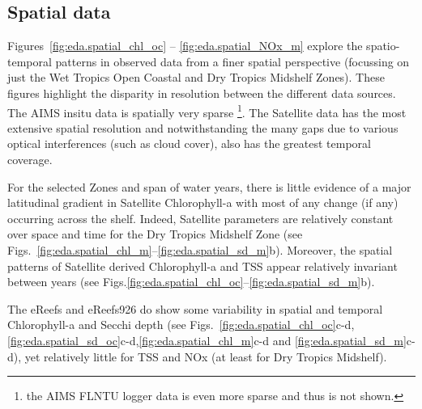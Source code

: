 \clearpage

\subsection{Spatial data}

Figures~\ref{fig:eda.spatial_chl_oc} -- \ref{fig:eda.spatial_NOx_m} explore the spatio-temporal
patterns in observed data from a finer spatial perspective (focussing on just the Wet Tropics Open
Coastal and Dry Tropics Midshelf Zones).  These figures highlight the disparity in resolution
between the different data sources. The AIMS insitu data is spatially very sparse \footnote{the AIMS
FLNTU logger data is even more sparse and thus is not shown.}.  The Satellite data has the most
extensive spatial resolution and notwithstanding the many gaps due to various optical interferences
(such as cloud cover), also has the greatest temporal coverage.

For the selected Zones and span of water years, there is little evidence of a major latitudinal
gradient in Satellite Chlorophyll-a with most of any change (if any) occurring across the shelf.
Indeed, Satellite parameters are relatively constant over space and time for the Dry Tropics
Midshelf Zone (see Figs.~\ref{fig:eda.spatial_chl_m}--\ref{fig:eda.spatial_sd_m}b).  Moreover, the
spatial patterns of Satellite derived Chlorophyll-a and TSS appear relatively invariant between
years (see Figs.\ref{fig:eda.spatial_chl_oc}--\ref{fig:eda.spatial_sd_m}b).

The eReefs and eReefs926 do show some variability in spatial and temporal Chlorophyll-a and Secchi
depth (see
Figs.~\ref{fig:eda.spatial_chl_oc}c-d,\ref{fig:eda.spatial_sd_oc}c-d,\ref{fig:eda.spatial_chl_m}c-d
and \ref{fig:eda.spatial_sd_m}c-d), yet relatively little for TSS and NOx (at least for Dry Tropics
Midshelf).


